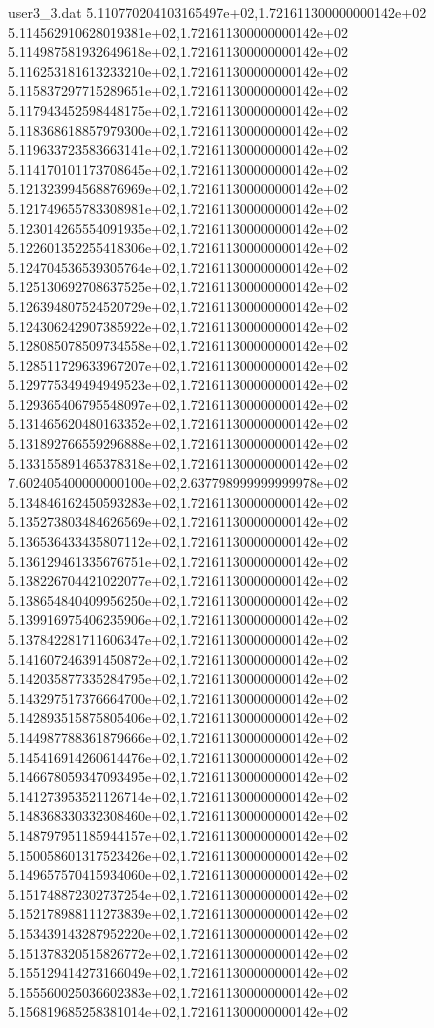 \begin{filecontents}{user3_3.dat}
5.110770204103165497e+02,1.721611300000000142e+02
5.114562910628019381e+02,1.721611300000000142e+02
5.114987581932649618e+02,1.721611300000000142e+02
5.116253181613233210e+02,1.721611300000000142e+02
5.115837297715289651e+02,1.721611300000000142e+02
5.117943452598448175e+02,1.721611300000000142e+02
5.118368618857979300e+02,1.721611300000000142e+02
5.119633723583663141e+02,1.721611300000000142e+02
5.114170101173708645e+02,1.721611300000000142e+02
5.121323994568876969e+02,1.721611300000000142e+02
5.121749655783308981e+02,1.721611300000000142e+02
5.123014265554091935e+02,1.721611300000000142e+02
5.122601352255418306e+02,1.721611300000000142e+02
5.124704536539305764e+02,1.721611300000000142e+02
5.125130692708637525e+02,1.721611300000000142e+02
5.126394807524520729e+02,1.721611300000000142e+02
5.124306242907385922e+02,1.721611300000000142e+02
5.128085078509734558e+02,1.721611300000000142e+02
5.128511729633967207e+02,1.721611300000000142e+02
5.129775349494949523e+02,1.721611300000000142e+02
5.129365406795548097e+02,1.721611300000000142e+02
5.131465620480163352e+02,1.721611300000000142e+02
5.131892766559296888e+02,1.721611300000000142e+02
5.133155891465378318e+02,1.721611300000000142e+02
7.602405400000000100e+02,2.637798999999999978e+02
5.134846162450593283e+02,1.721611300000000142e+02
5.135273803484626569e+02,1.721611300000000142e+02
5.136536433435807112e+02,1.721611300000000142e+02
5.136129461335676751e+02,1.721611300000000142e+02
5.138226704421022077e+02,1.721611300000000142e+02
5.138654840409956250e+02,1.721611300000000142e+02
5.139916975406235906e+02,1.721611300000000142e+02
5.137842281711606347e+02,1.721611300000000142e+02
5.141607246391450872e+02,1.721611300000000142e+02
5.142035877335284795e+02,1.721611300000000142e+02
5.143297517376664700e+02,1.721611300000000142e+02
5.142893515875805406e+02,1.721611300000000142e+02
5.144987788361879666e+02,1.721611300000000142e+02
5.145416914260614476e+02,1.721611300000000142e+02
5.146678059347093495e+02,1.721611300000000142e+02
5.141273953521126714e+02,1.721611300000000142e+02
5.148368330332308460e+02,1.721611300000000142e+02
5.148797951185944157e+02,1.721611300000000142e+02
5.150058601317523426e+02,1.721611300000000142e+02
5.149657570415934060e+02,1.721611300000000142e+02
5.151748872302737254e+02,1.721611300000000142e+02
5.152178988111273839e+02,1.721611300000000142e+02
5.153439143287952220e+02,1.721611300000000142e+02
5.151378320515826772e+02,1.721611300000000142e+02
5.155129414273166049e+02,1.721611300000000142e+02
5.155560025036602383e+02,1.721611300000000142e+02
5.156819685258381014e+02,1.721611300000000142e+02

\end{filecontents}
